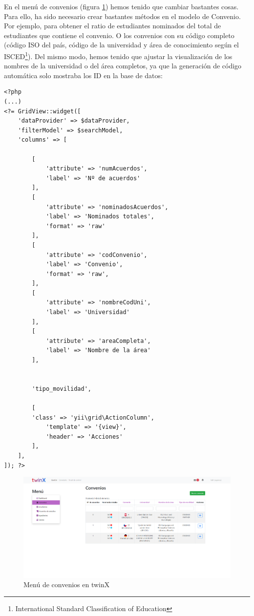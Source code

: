 En el menú de convenios (figura \ref{fig:menuconveniotwinX}) hemos tenido que cambiar bastantes cosas. Para ello, ha sido necesario crear bastantes métodos en el modelo de Convenio. Por ejemplo, para obtener el ratio de estudiantes nominados del total de estudiantes que contiene el convenio. O los convenios con su código completo (código ISO del país, código de la universidad y área de conocimiento según el ISCED\footnote{International Standard Classification of Education}). Del mismo modo, hemos tenido que ajustar la visualización de los nombres de la universidad o del área completos, ya que la generación de código automática solo mostraba los ID en la base de datos:

\begin{verbatim}
<?php
(...)
<?= GridView::widget([
	'dataProvider' => $dataProvider,
	'filterModel' => $searchModel,
	'columns' => [
	
		[
			'attribute' => 'numAcuerdos',
			'label' => 'Nº de acuerdos'
		],
		[
			'attribute' => 'nominadosAcuerdos',
			'label' => 'Nominados totales',
			'format' => 'raw'
		],
		[
			'attribute' => 'codConvenio',
			'label' => 'Convenio',
			'format' => 'raw',
		],
		[
			'attribute' => 'nombreCodUni',
			'label' => 'Universidad'
		],
		[
			'attribute' => 'areaCompleta',
			'label' => 'Nombre de la área'
		],
	
	
		'tipo_movilidad',
	
		[
		'class' => 'yii\grid\ActionColumn',
			'template' => '{view}',
			'header' => 'Acciones'
		],
	],
]); ?>
\end{verbatim}

\begin{figure}
	\centering
	\includegraphics[width=\linewidth]{img/Capturas de twinX/menu_convenio}
	\caption{Menú de convenios en twinX}
	\label{fig:menuconveniotwinX}
\end{figure}

